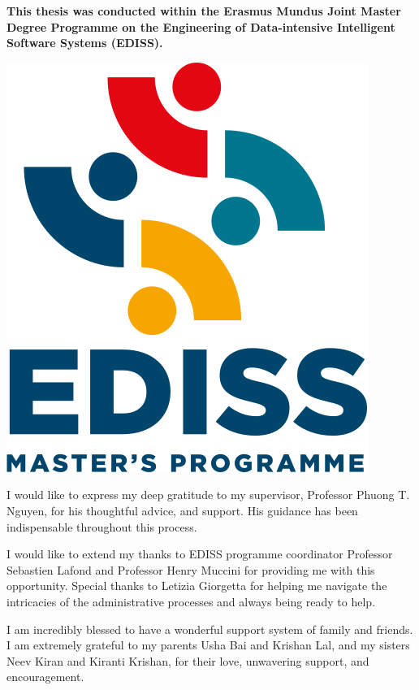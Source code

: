 \documentclass[
11pt, %
english, %
singlespacing, %
headsepline, %
]{MastersDoctoralThesis} %
\begin{document}

\begin{center}
	\vspace*{0.2\textheight}
	
	{\textbf{This thesis was conducted within the Erasmus Mundus Joint Master Degree Programme on the Engineering of Data-intensive Intelligent Software Systems (EDISS).}}

	\vspace{2cm}

	\includegraphics[width=0.4\linewidth]{Figures/logos/EDISS_Transparent.png}

	\vspace{2cm}
\end{center}



\begin{acknowledgements}
\addchaptertocentry{\acknowledgementname} %
I would like to express my deep gratitude to my supervisor, Professor Phuong T. Nguyen, for his thoughtful advice, and support. His guidance has been indispensable throughout this process.

I would like to extend my thanks to EDISS programme coordinator Professor Sebastien Lafond and Professor Henry Muccini for providing me with this opportunity. Special thanks to Letizia Giorgetta for helping me navigate the intricacies of the administrative processes and always being ready to help.

I am incredibly blessed to have a wonderful support system of family and friends. I am extremely grateful to my parents Usha Bai and Krishan Lal, and my sisters Neev Kiran and Kiranti Krishan, for their love, unwavering support, and encouragement. 


\end{acknowledgements}
\end{document}
